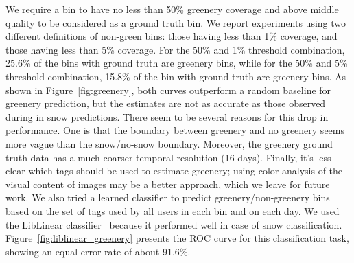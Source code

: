 We require a bin to have no less than 50\% greenery coverage and above
middle quality to be considered as a ground truth bin. We report
experiments using two different definitions of non-green bins: those
having less than 1\% coverage, and those having less than 5\%
coverage.  For the 50\% and 1\% threshold combination, 25.6\% of the
bins with ground truth are greenery bins, while for the 50\% and 5\%
threshold combination, 15.8\% of the bin with ground truth are
greenery bins.
As shown in Figure~\ref{fig:greenery}, both curves outperform a random baseline for greenery prediction, but the estimates
are not as accurate as those observed during in snow predictions. 
%
%
There seem to be several reasons for this drop in performance.
One is that the boundary between greenery and no greenery
seems more vague than the snow/no-snow boundary. 
Moreover, the greenery ground truth data has a much coarser temporal resolution (16 days).
Finally, it's less clear which tags should be used to estimate greenery; using color analysis of the visual content of images may be a better approach, which we leave for future work.
%
%
%
We also tried a learned classifier to predict greenery/non-greenery
bins based on the set of tags used by all users in each bin and on
each day.  We used the LibLinear classifier~\cite{Fan2008}
because it performed well in case of snow classification. 
Figure~\ref{fig:liblinear_greenery} presents the ROC curve for this classification task,
showing an equal-error rate of about 91.6\%.

